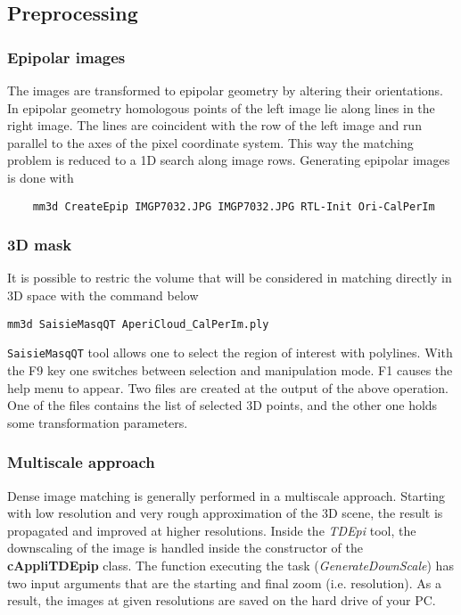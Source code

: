 \subsection{Preprocessing}\label{subsection:preproc}

\subsubsection{Epipolar images} The images are transformed to epipolar geometry by altering their orientations. In epipolar geometry homologous points of the left image lie along lines in the right image. The lines are coincident with the row of the left image and run parallel to the axes of the pixel coordinate system. This way the matching problem is reduced to a 1D search along image rows. Generating epipolar images is done with
\begin{lstlisting}
	mm3d CreateEpip IMGP7032.JPG IMGP7032.JPG RTL-Init Ori-CalPerIm
\end{lstlisting}

\subsubsection{3D mask}
It is possible to restric the volume that will be considered in matching directly in 3D space with the command below
\begin{lstlisting}
mm3d SaisieMasqQT AperiCloud_CalPerIm.ply
\end{lstlisting}

{\tt SaisieMasqQT} tool allows one to select the region of interest with polylines. With the F9 key one switches between selection and manipulation mode. F1 causes the help menu to appear. Two files are created at the output of the above operation. One of the files contains the list of selected 3D points, and the other one holds some transformation parameters.

\subsubsection{Multiscale approach}
Dense image matching is generally performed in a multiscale approach. Starting with low resolution and very rough approximation of the 3D scene, the result is propagated and improved at higher resolutions. Inside the \emph{TDEpi} tool, the downscaling of the image is handled inside the constructor of the \textbf{cAppliTDEpip} class. The function executing the task (\emph{GenerateDownScale}) has two input arguments that are the starting and final zoom (i.e. resolution). As a result, the images at given resolutions are saved on the hard drive of your PC.

